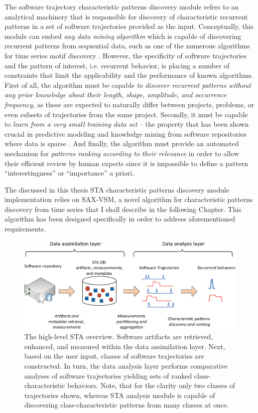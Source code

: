 The software trajectory characteristic patterns discovery module refers to an analytical machinery that 
is responsible for discovery of characteristic recurrent patterns in a set of software trajectories provided as 
the input. Conceptually, this module can embed \textit{any data mining algorithm} which is capable of 
discovering recurrent patterns from sequential data, such as one of the numerous algorithms for time series 
motif discovery \cite{citeulike:13197378}.
However, the specificity of software trajectories and the pattern of interest, i.e. recurrent behavior, 
is placing a number of constraints that limit the applicability and the performance of known algorithms.
First of all, the algorithm must be capable \textit{to discover recurrent patterns without any prior knowledge 
about their length, shape, amplitude, and occurrence frequency}, as these are expected to naturally differ 
between projects, problems, or even subsets of trajectories from the same project.
Secondly, it must be capable to \textit{learn from a very small training data set} --
the property that has been shown crucial in predictive modeling and knowledge mining from software 
repositories where data is sparse \cite{citeulike:6055293}.
And finally, the algorithm must provide an automated mechanism for 
\textit{patterns ranking according to their relevance} in order to allow their efficient 
review by human experts since it is impossible to define a pattern ``interestingness'' or 
``importance'' a priori.

The discussed in this thesis STA characteristic patterns discovery module implementation relies on SAX-VSM,
a novel algorithm for characteristic patterns discovery from time series that I shall describe in the following Chapter. 
This algorithm has been designed specifically in order to address aforementioned requirements.

\begin{figure}[t]
   \centering
   \includegraphics[width=150mm]{figures/Flow-analysis.eps}
   \caption{The high-level STA overview. Software artifacts are retrieved, enhanced, and measured within the
   data assimilation layer. Next, based on the user input, classes of software trajectories are constructed.   
   In turn, the data analysis layer performs comparative analyses of software trajectories yielding sets
   of ranked class-characteristic behaviors.
   Note, that for the clarity only two classes of trajectories shown, whereas STA analysis module is capable of
   discovering class-characteristic patterns from many classes at once.}
   \label{fig:sta-full-overview}
\end{figure}

